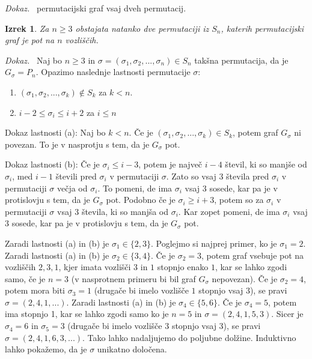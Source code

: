 \documentclass[a4paper, 12pt]{book}
\newtheorem{izrek}{Izrek}[chapter]
\newenvironment{dokaz}{\emph{Dokaz.}\ }{\hspace{\fill}{$\Box$}}
\begin{document}
\begin{dokaz}
permutacijski graf vsaj dveh permutacij.

\end{dokaz}

\begin{izrek}
\label{izrek_dve_permutaciji_poti}
    Za $n \geq 3$ obstajata natanko dve permutaciji iz $S_n$, katerih permutacijski graf je pot na $n$ vozliščih.
\end{izrek}
\begin{dokaz}
    Naj bo $n \geq 3$ in $\sigma = (\sigma_1, \sigma_2,..., \sigma_n) \in S_n$ takšna permutacija, da je $G_{\sigma} = P_n$. Opazimo naslednje lastnosti permutacije $\sigma$:
    \begin{enumerate}[label=(\alph*)]
        \item $(\sigma_1, \sigma_2, ..., \sigma_k) \notin S_k$ za $k < n$.
        \item $i-2 \leq \sigma_i \leq i+2$ za $i \leq n$
    \end{enumerate}
    
    Dokaz lastnosti (a): Naj bo $k < n$. Če je $(\sigma_1, \sigma_2, ..., \sigma_k) \in S_k$, potem graf $G_{\sigma}$ ni povezan. To je v nasprotju s tem, da je $G_{\sigma}$ pot.
    
    Dokaz lastnosti (b): Če je $\sigma_i \leq i-3$, potem je največ $i-4$ števil, ki so manjše od $\sigma_i$, med $i-1$ števili pred $\sigma_i$ v permutaciji $\sigma$. Zato so vsaj 3 števila pred $\sigma_i$ v permutaciji $\sigma$ večja od $\sigma_i$. To pomeni, de ima $\sigma_i$ vsaj $3$ sosede, kar pa je v protislovju s tem, da je $G_{\sigma}$ pot. Podobno če je $\sigma_i \geq i+3$, potem so za $\sigma_i$ v permutaciji $\sigma$ vsaj 3 števila, ki so manjša od $\sigma_i$. Kar zopet pomeni, de ima $\sigma_i$ vsaj $3$ sosede, kar pa je v protislovju s tem, da je $G_{\sigma}$ pot.

    Zaradi lastnosti (a) in (b) je $\sigma_1 \in \{ 2, 3\}$. Poglejmo si najprej primer, ko je $\sigma_1 = 2$. Zaradi lastnosti (a) in (b) je $\sigma_2 \in \{ 3, 4 \}$. Če je $\sigma_2 = 3$, potem graf vsebuje pot na vozliščih $2, 3, 1$, kjer imata vozlišči $3$ in $1$ stopnjo enako $1$, kar se lahko zgodi samo, če je $n = 3$ (v nasprotnem primeru bi bil graf $G_{\sigma}$ nepovezan). Če je $\sigma_2 = 4$, potem mora biti $\sigma_3 = 1$ (drugače bi imelo vozlišče $1$ stopnjo vsaj $3$), se pravi $\sigma = (2, 4, 1, ...)$. Zaradi lastnosti (a) in (b) je $\sigma_4 \in \{ 5, 6 \}$. Če je $\sigma_4 = 5$, potem ima stopnjo 1, kar se lahko zgodi samo ko je $n = 5$ in $\sigma = (2, 4, 1, 5, 3)$. Sicer je $\sigma_4 = 6$ in $\sigma_5 = 3$ (drugače bi imelo vozlišče $3$ stopnjo vsaj $3$), se pravi $\sigma = (2, 4, 1, 6, 3,...)$. Tako lahko nadaljujemo do poljubne dolžine. Induktivno lahko pokažemo, da je $\sigma$ unikatno določena. 
    

\end{dokaz}
\end{document}
